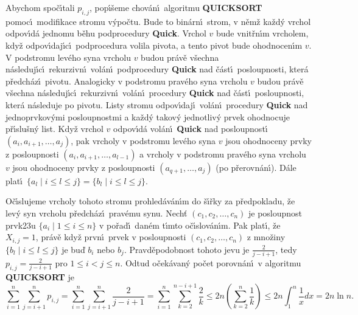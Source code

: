 \flushpar Abychom spo\v c\'\i tali $p_{i,j}$, pop\'\i\v seme chov\'an\'\i\ algoritmu 
{\bf QUICKSORT} pomoc\'\i\ modifikace stromu v\'ypo\v ctu. Bude to bin\'arn\'\i\ 
strom, v n\v em\v z ka\v zd\'y vrchol odpov\'\i d\'a jednomu 
b\v ehu podprocedury {\bf Quick}. Vrchol $v$ bude vnit\v rn\'\i m 
vrcholem, 
kdy\v z odpov\'\i da\-j\'\i\-c\'\i\ podprocedura volila pivota, a tento 
pivot bude ohodnocen\'\i m $v$. V podstromu lev\'eho syna vrcholu $
v$
budou pr\'av\v e v\v sechna n\'asleduj\'\i c\'\i\ rekurzivn\'\i\ vol\'an\'\i\ podprocedury 
{\bf Quick} nad \v c\'ast\'\i\ posloupnosti, kter\'a p\v redch\'az\'\i\ pivotu. 
Analogicky v podstromu 
prav\'eho syna vrcholu $v$ budou pr\'av\v e v\v sechna n\'asleduj\'\i c\'\i\ 
rekurzivn\'\i\ vol\'an\'\i\ procedury {\bf Quick} nad \v c\'ast\'\i\ 
posloupnosti, kter\'a n\'asleduje po pivotu. 
Listy stromu odpov\'\i daj\'\i\ vol\'an\'\i\ procedury {\bf Quick} nad 
jednoprvkov\'ymi posloupnost\-mi a ka\v zd\'y takov\'y jednotliv\'y 
prvek ohodnocuje p\v r\'\i slu\v sn\'y  
list. Kdy\v z vrchol $v$ odpov\'\i d\'a vol\'an\'\i\ {\bf Quick} nad posloupnost\'\i\ 
$(a_i,a_{i+1},\dots,a_j)$, pak vrcholy v podstromu lev\'eho syna $
v$ jsou 
ohodnoceny prvky z posloupnosti $(a_i,a_{i+1},\dots,a_{l-1})$ a vrcholy v 
podstromu prav\'eho syna vrcholu $v$ jsou ohodnoceny prvky z posloupnosti 
$(a_{q+1},\dots,a_j)$ (po p\v rerovn\'an\'\i ).
D\'ale plat\'\i\ $\{a_l\mid i\le l\le j\}=\{b_l\mid i\le l\le j\}$.
\medskip

\flushpar O\v c\'\i slujeme vrcholy tohoto stromu prohled\'av\'an\'\i m do 
\v s\'\i\v rky za p\v redpokladu, \v ze lev\'y syn vrcholu p\v redch\'az\'\i\ 
prav\'emu synu. Nech\v t $(c_1,c_2,\dots,c_n)$ je posloupnost 
prvk\accent23u $\{a_i\mid 1\le i\le n\}$ v po\v rad\'\i\ dan\'em t\'\i mto 
o\v c\'\i slov\'an\'\i m. Pak plat\'\i , \v ze $X_{i,j}=1$, pr\'av\v e kdy\v z prvn\'\i\ 
prvek v posloupnosti $(c_1,c_2,\dots,c_n)$ z mno\v zi\-ny 
$\{b_l\mid i\le l\le j\}$ je bu\v d $b_i$ nebo $b_j$. Pravd\v epodobnost tohoto 
jevu je $\frac 2{j-i+1}$, tedy $p_{i,j}=\frac 2{j-i+1}$ pro $1\le 
i<j\le n$. Odtud 
o\v cek\'avan\'y po\v cet porovn\'an\'\i\ v algoritmu {\bf QUICKSORT} je
$$\sum_{i=1}^n\sum_{j=i+1}^np_{i,j}=\sum_{i=1}^n\sum_{j=i+1}^n\frac 
2{j-i+1}=\sum_{i=1}^n\sum_{k=2}^{n-i+1}\frac 2k\le 2n(\sum_{k=2}^
n\frac 1k)\le 2n\int_1^n\frac 1xdx=2n\ln n.$$
\medskip

